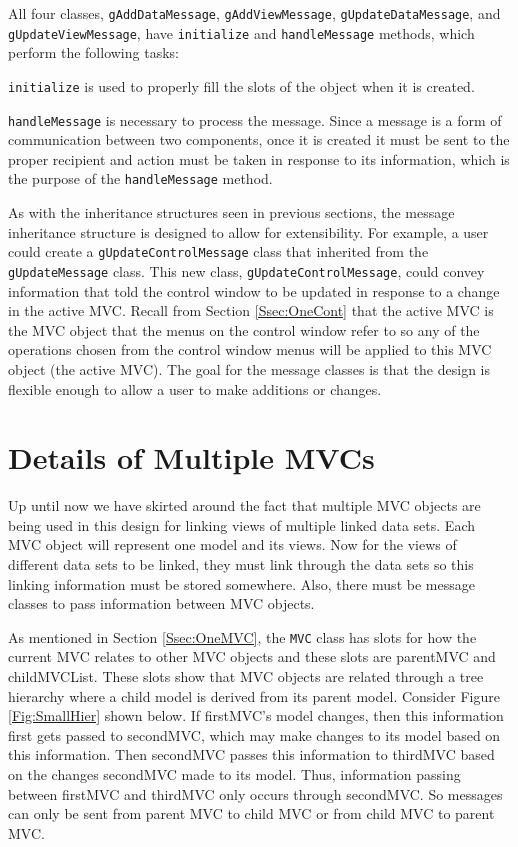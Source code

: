 \documentclass{article}[11pt]
\newcommand{\Rfunction}[1]{{\texttt{#1}}}
\newcommand{\Robject}[1]{{\texttt{#1}}}
\begin{document}
All four classes, \Robject{gAddDataMessage}, \Robject{gAddViewMessage},
\Robject{gUpdateDataMessage}, and \Robject{gUpdateViewMessage}, have
\Rfunction{initialize} and \Rfunction{handleMessage} methods, which perform
the following tasks:

\begin{list}{}{\setlength{\leftmargin}{0.5in}
               \setlength{\itemsep}{0in}}
  \item \Rfunction{initialize} is used to properly fill the slots of the
object when it is created.  
  \item \Rfunction{handleMessage} is necessary to
process the message.  Since a message is a form of communication
between two components, once it is created it must be sent to the
proper recipient and action must be taken in response to its
information, which is the purpose of the \Rfunction{handleMessage} method.
\end{list}

As with the inheritance structures seen in previous sections, the message
inheritance structure is designed to allow for extensibility.  For example, a
user could create a \Robject{gUpdateControlMessage} class that inherited from
the \Robject{gUpdateMessage} class.  This new class,
\Robject{gUpdateControlMessage}, could convey information that told the
control window to be updated in response to a change in the active MVC.
Recall from Section \ref{Ssec:OneCont} that the active MVC is the MVC object
that the menus on the control window refer to so any of the operations chosen
from the control window menus will be applied to this MVC object (the active
MVC).  The goal for the message classes is that the design is flexible enough
to allow a user to make additions or changes.

\section{Details of Multiple MVCs}\label{Sec:MultMVC}

Up until now we have skirted around the fact that multiple MVC objects are
being used in this design for linking views of multiple linked data sets.
Each MVC object will represent one model and its views.  Now for the views of
different data sets to be linked, they must link through the data sets so this
linking information must be stored somewhere.  Also, there must be
message classes to pass information between MVC objects.

As mentioned in Section \ref{Ssec:OneMVC}, the \Robject{MVC} class has slots
for how the current MVC relates to other MVC objects and these slots are
parentMVC and childMVCList.  These slots show that MVC objects are related
through a tree hierarchy where a child model is derived from its parent
model.  Consider Figure \ref{Fig:SmallHier} shown below.  If firstMVC's model
changes, then this information first gets passed to secondMVC, which may make
changes to its model based on this information.  Then secondMVC passes this
information to thirdMVC based on the changes secondMVC made to its model.
Thus, information passing between firstMVC and thirdMVC only occurs through
secondMVC.  So messages can only be sent from parent MVC to child MVC or from
child MVC to parent MVC.
\end{document}
